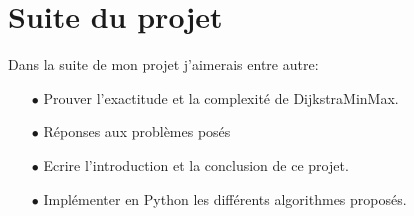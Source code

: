 

\section{Suite du projet}

Dans la suite de mon projet j'aimerais entre autre:

\begin{enumerate}
	\item[$\bullet$] Prouver l'exactitude et la complexité de DijkstraMinMax.
	\item[$\bullet$] Réponses aux problèmes posés
	\item[$\bullet$] Ecrire l'introduction et la conclusion de ce projet.
	\item[$\bullet$] Implémenter en Python les différents algorithmes proposés.
\end{enumerate}